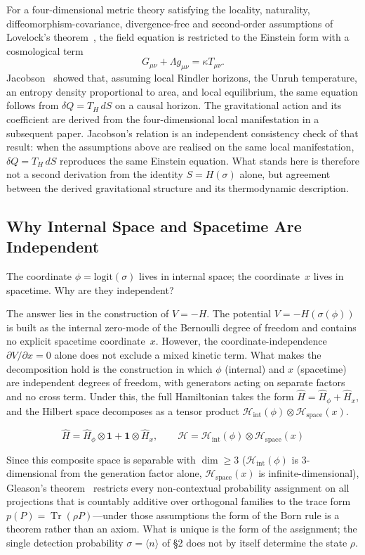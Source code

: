 \documentclass[12pt,a4paper]{article}
\begin{document}
For a four-dimensional metric theory satisfying the locality,
naturality, diffeomorphism-covariance, divergence-free and
second-order assumptions of Lovelock's theorem~\cite{lovelock}, the
field equation is restricted to the Einstein form with a
cosmological term
\[G_{\mu\nu} + \Lambda g_{\mu\nu} = \kappa T_{\mu\nu}.\]
Jacobson~\cite{jacobson} showed that, assuming local Rindler
horizons, the Unruh temperature, an entropy density proportional to
area, and local equilibrium, the same equation follows from
$\delta Q = T_H\,dS$ on a causal horizon.
The gravitational action and its coefficient are derived from the
four-dimensional local manifestation in a subsequent paper.
Jacobson’s relation is an independent consistency check of that
result: when the assumptions above are realised on the same local
manifestation, $\delta Q = T_H\,dS$ reproduces the same Einstein
equation. What stands here is therefore not a second derivation from
the identity $S = H(\sigma)$ alone, but agreement between the derived
gravitational structure and its thermodynamic description.

\subsection{Why Internal Space and Spacetime Are Independent}\label{sec:tensor}

The coordinate $\phi = \mathrm{logit}(\sigma)$ lives in internal space;
the coordinate~$x$ lives in spacetime.  Why are they independent?

The answer lies in the construction of $V = -H$. The potential $V = -H(\sigma(\phi))$ is built as the internal zero-mode of the Bernoulli degree of freedom and contains no explicit spacetime coordinate~$x$. However, the coordinate-independence $\partial V/\partial x = 0$ alone does not exclude a mixed kinetic term. What makes the decomposition hold is the construction in which $\phi$ (internal) and $x$ (spacetime) are independent degrees of freedom, with generators acting on separate factors and no cross term. Under this, the full Hamiltonian takes the form $\hat{H} = \hat{H}_\phi + \hat{H}_x$, and the Hilbert space decomposes as a tensor product $\mathcal{H}_\mathrm{int}(\phi) \otimes \mathcal{H}_\mathrm{space}(x)$.

\[\hat{H} = \hat{H}_\phi \otimes \mathbf{1} + \mathbf{1} \otimes \hat{H}_x,\qquad \mathcal{H} = \mathcal{H}_\mathrm{int}(\phi) \otimes \mathcal{H}_\mathrm{space}(x)\]

Since this composite space is separable with $\dim \geq 3$
($\mathcal{H}_\mathrm{int}(\phi)$ is 3-dimensional from the generation factor alone,
$\mathcal{H}_\mathrm{space}(x)$ is infinite-dimensional),
Gleason's theorem~\cite{gleason} restricts every non-contextual probability assignment on all projections that is countably additive over orthogonal families to the trace form $p(P) = \operatorname{Tr}(\rho P)$---under those assumptions the form of the Born rule is a theorem rather than an axiom. What is unique is the form of the assignment; the single detection probability $\sigma = \langle n \rangle$ of \S2 does not by itself determine the state $\rho$.
\end{document}
